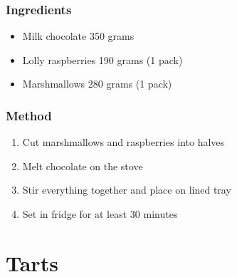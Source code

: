 \documentclass[]{article}
\begin{document}
\subsubsection*{\Large Ingredients}
\begin{multicols}{2}
\begin{itemize}
 \item Milk chocolate \hfill 350 grams
 \item Lolly raspberries \hfill 190 grams (1 pack)
 \item Marshmallows \hfill 280 grams (1 pack)
\end{itemize}
\end{multicols}
\subsubsection*{\Large Method}
\begin{enumerate}[font=\huge\color{accent}]
	\item Cut marshmallows and raspberries into halves
	\item Melt chocolate on the stove
	\item Stir everything together and place on lined tray
	\item Set in fridge for at least 30 minutes
\end{enumerate}
\newpage
{}
\section*{\center\Huge\color{accent}Tarts}
\label{cat:Tarts}
\label{rec:Lemon Tart}
\end{document}
